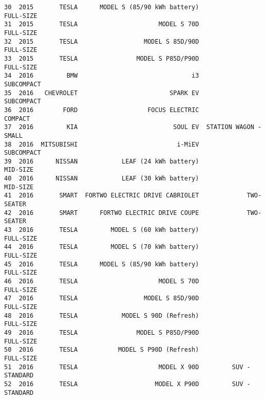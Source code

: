 \documentclass[11pt]{article}
\begin{document}
\begin{Verbatim}[commandchars=\\\{\}]
30  2015       TESLA      MODEL S (85/90 kWh battery)              FULL-SIZE   
31  2015       TESLA                      MODEL S 70D              FULL-SIZE   
32  2015       TESLA                  MODEL S 85D/90D              FULL-SIZE   
33  2015       TESLA                MODEL S P85D/P90D              FULL-SIZE   
34  2016         BMW                               i3             SUBCOMPACT   
35  2016   CHEVROLET                         SPARK EV             SUBCOMPACT   
36  2016        FORD                   FOCUS ELECTRIC                COMPACT   
37  2016         KIA                          SOUL EV  STATION WAGON - SMALL   
38  2016  MITSUBISHI                           i-MiEV             SUBCOMPACT   
39  2016      NISSAN            LEAF (24 kWh battery)               MID-SIZE   
40  2016      NISSAN            LEAF (30 kWh battery)               MID-SIZE   
41  2016       SMART  FORTWO ELECTRIC DRIVE CABRIOLET             TWO-SEATER   
42  2016       SMART      FORTWO ELECTRIC DRIVE COUPE             TWO-SEATER   
43  2016       TESLA         MODEL S (60 kWh battery)              FULL-SIZE   
44  2016       TESLA         MODEL S (70 kWh battery)              FULL-SIZE   
45  2016       TESLA      MODEL S (85/90 kWh battery)              FULL-SIZE   
46  2016       TESLA                      MODEL S 70D              FULL-SIZE   
47  2016       TESLA                  MODEL S 85D/90D              FULL-SIZE   
48  2016       TESLA            MODEL S 90D (Refresh)              FULL-SIZE   
49  2016       TESLA                MODEL S P85D/P90D              FULL-SIZE   
50  2016       TESLA           MODEL S P90D (Refresh)              FULL-SIZE   
51  2016       TESLA                      MODEL X 90D         SUV - STANDARD   
52  2016       TESLA                     MODEL X P90D         SUV - STANDARD   


\end{Verbatim}
\end{document}
